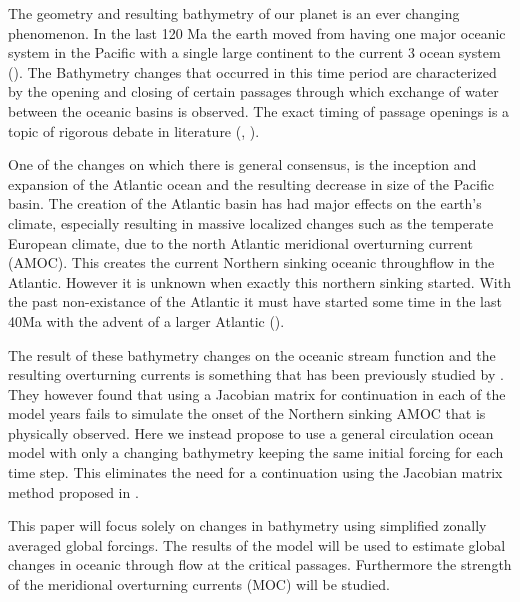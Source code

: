 The geometry and resulting bathymetry of our planet is an ever changing phenomenon. In the last 120 Ma the earth moved from having one major oceanic system in the Pacific with a single large continent to the current 3 ocean system (\cite{besse2002apparent}). The Bathymetry changes that occurred in this time period are characterized by the opening and closing of certain passages through which exchange of water between the oceanic basins is observed. The exact timing of passage openings is a topic of rigorous debate in literature (\cite{Scher2006Apr}, \cite{Schmidt2007Jan}).


One of the changes on which there is general consensus, is the inception and expansion of the Atlantic ocean and the resulting decrease in size of the Pacific basin. The creation of the Atlantic basin has had major effects on the earth's climate, especially resulting in massive localized changes such as the temperate European climate, due to the north Atlantic meridional overturning current (AMOC). This creates the current Northern sinking oceanic throughflow in the Atlantic. However it is unknown when exactly this northern sinking started. With the past non-existance of the Atlantic it must have started some time in the last 40Ma with the advent of a larger Atlantic (\cite{Abelson2017onset}). 

The result of these bathymetry changes on the oceanic stream function and the resulting overturning currents is something that has been previously studied by \cite{Mulder2017Jul}. They however found that using a Jacobian matrix for continuation in each of the model years fails to simulate the onset of the Northern sinking AMOC that is physically observed. Here we instead propose to use a general circulation ocean model with only a changing bathymetry keeping the same initial forcing for each time step. This eliminates the need for a continuation using the Jacobian matrix method proposed in \cite{Mulder2017Jul}.

This paper will focus solely on changes in bathymetry using simplified zonally averaged global forcings. The results of the model will be used to estimate global changes in oceanic through flow at the critical passages. Furthermore the strength of the meridional overturning currents (MOC) will be studied.

